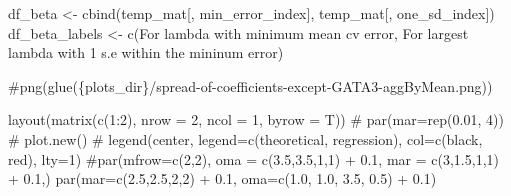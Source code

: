 \documentclass[
  letterpaper,
  DIV=11,
  numbers=noendperiod]{scrartcl}
\newenvironment{Shaded}{\begin{snugshade}}{\end{snugshade}}
\newcommand{\AttributeTok}[1]{\textcolor[rgb]{0.40,0.45,0.13}{#1}}
\newcommand{\CommentTok}[1]{\textcolor[rgb]{0.37,0.37,0.37}{#1}}
\newcommand{\DecValTok}[1]{\textcolor[rgb]{0.68,0.00,0.00}{#1}}
\newcommand{\FloatTok}[1]{\textcolor[rgb]{0.68,0.00,0.00}{#1}}
\newcommand{\FunctionTok}[1]{\textcolor[rgb]{0.28,0.35,0.67}{#1}}
\newcommand{\NormalTok}[1]{\textcolor[rgb]{0.00,0.23,0.31}{#1}}
\newcommand{\OtherTok}[1]{\textcolor[rgb]{0.00,0.23,0.31}{#1}}
\newcommand{\SpecialCharTok}[1]{\textcolor[rgb]{0.37,0.37,0.37}{#1}}
\newcommand{\StringTok}[1]{\textcolor[rgb]{0.13,0.47,0.30}{#1}}
\begin{document}
\begin{Shaded}
\begin{Highlighting}[]
\NormalTok{df\_beta }\OtherTok{\textless{}{-}} \FunctionTok{cbind}\NormalTok{(temp\_mat[, min\_error\_index], temp\_mat[, one\_sd\_index])}
\NormalTok{df\_beta\_labels }\OtherTok{\textless{}{-}} \FunctionTok{c}\NormalTok{(}\StringTok{\textquotesingle{}For lambda with minimum mean cv error\textquotesingle{}}\NormalTok{, }\StringTok{\textquotesingle{}For largest lambda with 1 s.e within the mininum error\textquotesingle{}}\NormalTok{)}
\end{Highlighting}
\end{Shaded}

\begin{Shaded}
\begin{Highlighting}[]
\CommentTok{\#png(glue(\textquotesingle{}\{plots\_dir\}/spread{-}of{-}coefficients{-}except{-}GATA3{-}aggByMean.png\textquotesingle{}))}

\FunctionTok{layout}\NormalTok{(}\FunctionTok{matrix}\NormalTok{(}\FunctionTok{c}\NormalTok{(}\DecValTok{1}\SpecialCharTok{:}\DecValTok{2}\NormalTok{), }\AttributeTok{nrow =} \DecValTok{2}\NormalTok{, }\AttributeTok{ncol =} \DecValTok{1}\NormalTok{, }\AttributeTok{byrow =}\NormalTok{ T))}
\CommentTok{\# par(mar=rep(0.01, 4))}
\CommentTok{\# plot.new()}
\CommentTok{\# legend(\textquotesingle{}center\textquotesingle{}, legend=c(\textquotesingle{}theoretical\textquotesingle{}, \textquotesingle{}regression\textquotesingle{}), col=c(\textquotesingle{}black\textquotesingle{}, \textquotesingle{}red\textquotesingle{}), lty=1)}
\CommentTok{\#par(mfrow=c(2,2), oma = c(3.5,3.5,1,1) + 0.1, mar = c(3,1.5,1,1) + 0.1,)}
\FunctionTok{par}\NormalTok{(}\AttributeTok{mar=}\FunctionTok{c}\NormalTok{(}\FloatTok{2.5}\NormalTok{,}\FloatTok{2.5}\NormalTok{,}\DecValTok{2}\NormalTok{,}\DecValTok{2}\NormalTok{) }\SpecialCharTok{+} \FloatTok{0.1}\NormalTok{, }\AttributeTok{oma=}\FunctionTok{c}\NormalTok{(}\FloatTok{1.0}\NormalTok{, }\FloatTok{1.0}\NormalTok{, }\FloatTok{3.5}\NormalTok{, }\FloatTok{0.5}\NormalTok{) }\SpecialCharTok{+} \FloatTok{0.1}\NormalTok{)}


\end{Highlighting}
\end{Shaded}
\end{document}
